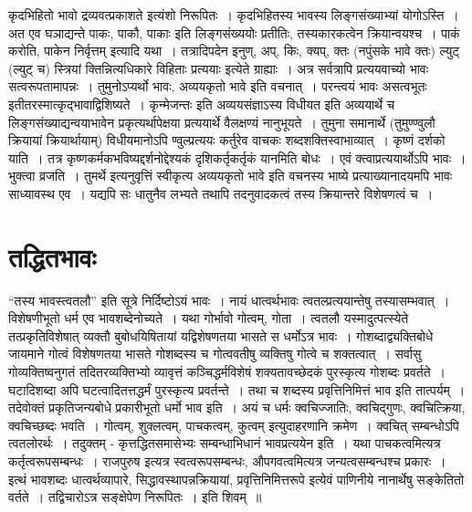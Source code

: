 {कृदभिहितो भावो द्रव्यवत्प्रकाशते इत्यंशो निरूपितः~। कृदभिहितस्य भावस्य \hbox{लिङ्गसंख्याभ्यां} योगोऽस्ति~। अत एव घञाद्यन्ते पाकः, पाकौ, पाकाः इति लिङ्गसंख्ययोः प्रतीतिः, तस्य\break कारकत्वेन क्रियान्वयश्च~। पाकं करोति, पाकेन निर्वृत्तम् इत्यादि यथा~। तत्रादिपदेन इनुण्, अप्, किः, क्यप्, क्तः (नपुंसके भावे क्तः) ल्युट् (ल्युट् च) स्त्रियां क्तिन्नित्यधिकारे विहिताः प्रत्ययाः इत्येते ग्राह्याः~। अत्र सर्वत्रापि प्रत्ययवाच्यो भावः सत्वरूपतामापन्नः~। तुमुनोऽप्यर्थो भावः, अव्ययकृतो भावे इति वचनात्~। परन्त्वयं भावः असत्वभूतः इतीतरस्मात्कृद्भावाद्विशिष्यते~। कृन्मेजन्तः इति अव्ययसंज्ञाऽस्य विधीयत इति अव्ययार्थे च लिङ्गसंख्याद्यन्वयाभावेन प्रकृत्यर्थापेक्षया प्रत्ययार्थे वैलक्षण्यं नानुभूयते~। तुमुना समानार्थे (तुमुण्ण्वुलौ क्रियायां क्रियार्थायाम्) विधीयमानोऽपि ण्वुल्प्रत्ययः कर्तुरेव वाचकः शब्दशक्तिस्वाभाव्यात्~। कृष्णं दर्शको याति~। तत्र कृष्णकर्मकभविष्यद्दर्शनोद्देश्यकं दृशिकर्तृकर्तृकं यानमिति बोधः~। एवं क्त्वाप्रत्ययार्थोऽपि भावः~। भुक्त्वा व्रजति~। तुमर्थे इत्यनुवृत्तिं स्वीकृत्य अव्ययकृतो भावे इति वचनस्य भाष्ये प्रत्याख्यानादयमपि भावः साध्यावस्थ एव~। यद्यपि सः धातुनैव लभ्यते तथापि तदनुवादकत्वं तस्य क्रियान्तरे विशेषणत्वं च~। 
~\\[-1cm]
\section*{तद्धितभावः}

“तस्य भावस्त्वतलौ” इति सूत्रे निर्दिष्टोऽयं भावः~। नायं धात्वर्थभावः त्वतल्प्रत्ययान्तेषु तस्यासम्भवात्~। विशेषणीभूतो धर्म एव भावशब्देनोच्यते~। यथा गोर्भावो गोत्वम्, गोता~। त्वतलौ यस्मादुत्पत्स्येते तत्प्रकृतिविशेषात् व्यक्तौ बुबोधयिषितायां यद्विशेषणतया भासते स धर्मोऽत्र भावः~। गोशब्दाद्व्यक्तिबोधे जायमाने गोत्वं विशेषणतया भासते गोशब्दस्य च गोत्ववतीषु व्यक्तिषु गोत्वे च शक्तत्वात्~। सर्वासु गोव्यक्तिष्वनुगतं तदितरव्यक्तिभ्यो व्यावृत्तं कञ्चिद्धर्मविशेषं शक्यतावच्छेदकं पुरस्कृत्य गोशब्दः प्रवर्तते~। घटादिशब्दा अपि घटत्वादितत्तद्धर्मं पुरस्कृत्य प्रवर्तन्ते~। तथा च शब्दस्य प्रवृत्तिनिमित्तं भाव इति तात्पर्यम्~। तदेवोक्तं प्रकृतिजन्यबोधे प्रकारीभूतो धर्मो भाव इति~। अयं च धर्मः क्वचिज्जातिः, क्वचिद्गुणः, क्वचित्क्रिया, क्वचिच्छब्दः भवति~। गोत्वम्, शुक्लत्वम्, पाचकत्वम्, कुत्वम् इत्युदाहरणानि क्रमेण~। क्वचित् सम्बन्धोऽपि त्वतलोरर्थः~। तदुक्तम् - कृत्तद्धितसमासेभ्यः सम्बन्धाभिधानं भावप्रत्ययेन इति~। यथा पाचकत्वमित्यत्र कर्तृत्वरूपसम्बन्धः~। राजपुरुष इत्यत्र स्वत्वरूपसम्बन्धः, औपगवत्वमित्यत्र जन्यत्वसम्बन्धश्च प्रकारः~। 
~\\[0.1cm]
इत्थं भावशब्दः धात्वर्थव्यापारे, सिद्धावस्थापन्नक्रियायां, प्रवृत्तिनिमित्तरूपे इत्येवं पाणिनीये नानार्थेषु सङ्केतितो वर्तते~। तद्विचारोऽत्र सङ्क्षेपेण निरूपितः~। इति शिवम्~॥

\articleend
}
